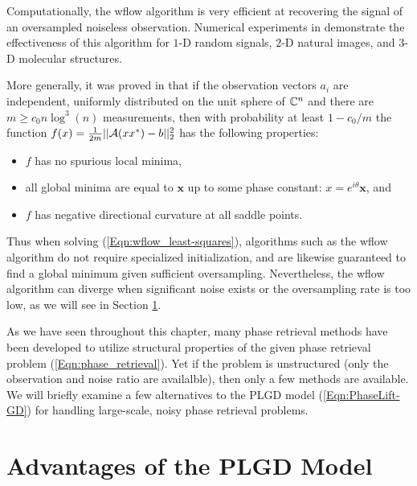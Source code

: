 Computationally, the wflow algorithm is very efficient at recovering the signal of an oversampled noiseless observation.  Numerical experiments in \cite[Section 4]{DBLP:journals/tit/CandesLS15} demonstrate the effectiveness of this algorithm for $1$-D random signals, $2$-D natural images, and $3$-D molecular structures.  


More generally, it was proved in \cite{sun2016geometric} that if the observation vectors $a_i$ are independent, uniformly distributed on the unit sphere of ${\mathbb C}^n$ and there are $m \geq c_0 n \log^3(n)$ measurements, then with probability at least $1-c_0/m$ the function $f(x) = \frac{1}{2m}||{\mathcal A}(xx^*) - b||_2^2$ has the following properties:

\begin{itemize} 		

\item 
$f$ has no spurious local minima,

\item
all global minima are equal to $\mathbf{x}$ up to some phase constant: $x = e^{i \theta}\mathbf{x}$, and

\item
$f$ has negative directional curvature at all saddle points.

\end{itemize}

Thus when solving (\ref{Eqn:wflow_least-squares}), algorithms such as the wflow algorithm do not require specialized initialization, and are likewise guaranteed to find a global minimum given sufficient oversampling.  
Nevertheless, the wflow algorithm can diverge when significant noise exists or the oversampling rate is too low, as we will see in Section \ref{Subsec:phase_retrieval-why_optimize_PLGD_model}.


As we have seen throughout this chapter, many phase retrieval methods have been developed to utilize structural properties of the given phase retrieval problem (\ref{Eqn:phase_retrieval}).  
Yet if the problem is unstructured (only the observation and noise ratio are availalble), then only a few methods are available.   
We will briefly examine a few alternatives to the PLGD model (\ref{Eqn:PhaseLift-GD}) for handling large-scale, noisy phase retrieval problems.




\section{Advantages of the PLGD Model}		\label{Subsec:phase_retrieval-why_optimize_PLGD_model}




